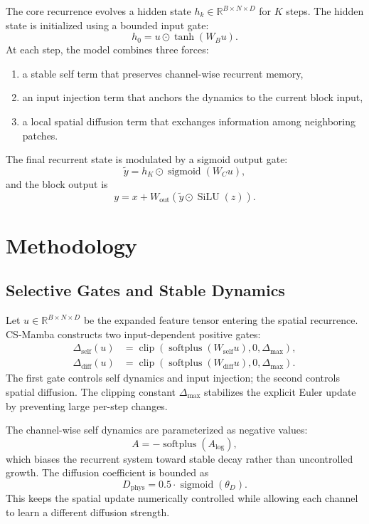 \documentclass[11pt]{article}
\newcommand{\csm}{CS-Mamba}
\newcommand{\R}{\mathbb{R}}
\newcommand{\sigmoid}{\operatorname{sigmoid}}
\newcommand{\softplus}{\operatorname{softplus}}
\newcommand{\silu}{\operatorname{SiLU}}
\begin{document}
The core recurrence evolves a hidden state $h_k \in \R^{B \times N \times D}$ for
$K$ steps. The hidden state is initialized using a bounded input gate:
\[
    h_0 = u \odot \tanh(W_B u).
\]
At each step, the model combines three forces:
\begin{enumerate}
    \item a stable self term that preserves channel-wise recurrent memory,
    \item an input injection term that anchors the dynamics to the current block input,
    \item a local spatial diffusion term that exchanges information among neighboring patches.
\end{enumerate}
The final recurrent state is modulated by a sigmoid output gate:
\[
    \tilde{y} = h_K \odot \sigmoid(W_C u),
\]
and the block output is
\[
    y = x + W_{\mathrm{out}}\left(\tilde{y} \odot \silu(z)\right).
\]

\section{Methodology}

\subsection{Selective Gates and Stable Dynamics}

Let $u \in \R^{B \times N \times D}$ be the expanded feature tensor entering the
spatial recurrence. \csm{} constructs two input-dependent positive gates:
\begin{align}
    \Delta_{\mathrm{self}}(u)
        &= \operatorname{clip}\!\left(
            \softplus(W_{\mathrm{self}} u), 0, \Delta_{\max}
        \right), \\
    \Delta_{\mathrm{diff}}(u)
        &= \operatorname{clip}\!\left(
            \softplus(W_{\mathrm{diff}} u), 0, \Delta_{\max}
        \right).
\end{align}
The first gate controls self dynamics and input injection; the second controls
spatial diffusion. The clipping constant $\Delta_{\max}$ stabilizes the explicit
Euler update by preventing large per-step changes.

The channel-wise self dynamics are parameterized as negative values:
\[
    A = -\softplus(A_{\log}),
\]
which biases the recurrent system toward stable decay rather than uncontrolled
growth. The diffusion coefficient is bounded as
\[
    D_{\mathrm{phys}} = 0.5 \cdot \sigmoid(\theta_D).
\]
This keeps the spatial update numerically controlled while allowing each channel
to learn a different diffusion strength.
\end{document}
